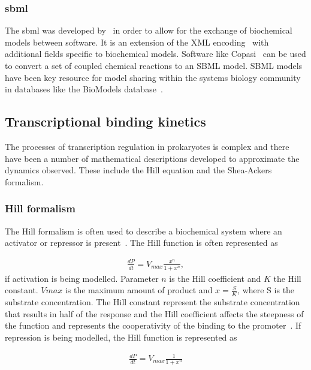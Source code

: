 \subsubsection{\acrfull{sbml}}

The \acrfull{sbml} was developed by~\textcite{Hucka:2004wh} in order to allow for the exchange of biochemical models between software. It is an extension of the XML encoding~\autocite{DuCharme:1999} with additional fields specific to biochemical models. Software like Copasi~\autocite{Hoops:2006gy} can be used to convert a set of coupled chemical reactions to an SBML model. SBML models have been key resource for model sharing within the systems biology community~\autocite{Wilkinson:2006td} in databases like the BioModels database~\autocite{LeNovere:2006ep}. 

\subsection{Transcriptional binding kinetics}

The processes of transcription regulation in prokaryotes is complex and there have been a number of mathematical descriptions developed to approximate the dynamics observed. These include the Hill equation and the Shea-Ackers formalism. 

\subsubsection{Hill formalism}
\label{sec:hill}
The Hill formalism is often used to describe a biochemical system where an activator or repressor is present~\autocite{Alon:2007}. The Hill function is often represented as

\begin{align*}
	\frac{dP}{dt} = V_{max}\frac{x^n}{1 + x^n},
\end{align*}
\noindent if activation is being modelled. Parameter $n$ is the Hill coefficient and $K$ the Hill constant. $V{max}$ is the maximum amount of product and $x = \frac{S}{K}$, where S is the substrate concentration. The Hill constant represent the substrate concentration that results in half of the response and the Hill coefficient affects the steepness of the function and represents the cooperativity of the binding to the promoter~\autocite{Alon:2007}. If repression is being modelled, the Hill function is represented as

\begin{align*}
	\frac{dP}{dt} = V_{max}\frac{1}{1 + x^n}
\end{align*}



